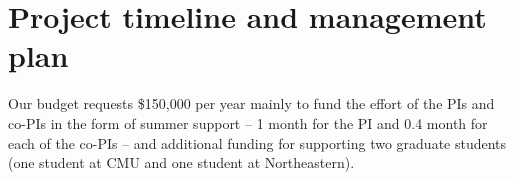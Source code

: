\section{Project timeline and management plan}

Our budget requests \$150,000 per year mainly to fund the effort of
the PIs and co-PIs in the form of summer support -- 1 month for the PI
and 0.4 month for each of the co-PIs -- and additional funding for
supporting two graduate students (one student at CMU and one student
at Northeastern).  

